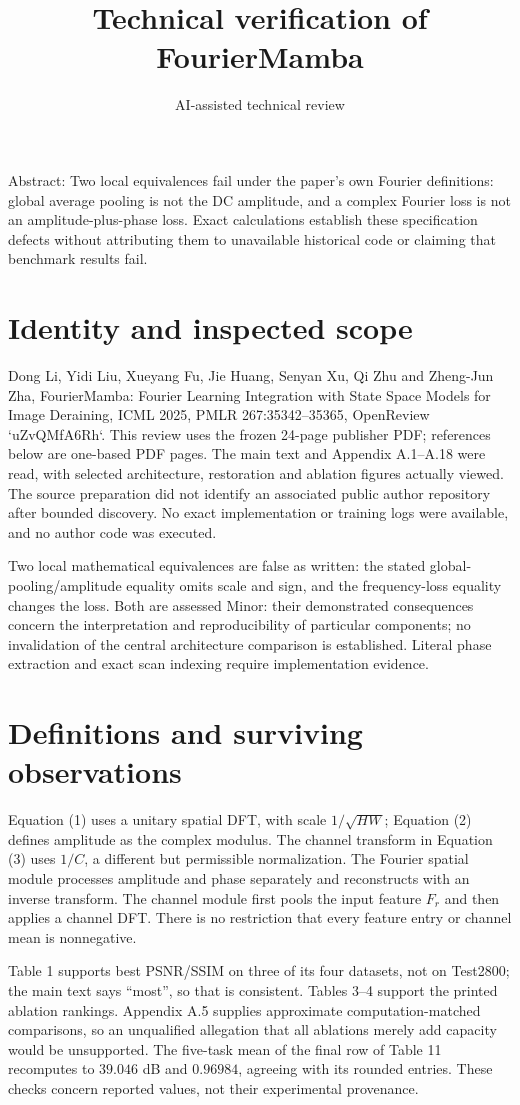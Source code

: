 \documentclass[10pt]{article}
\title{Technical verification of FourierMamba}
\author{AI-assisted technical review}
\date{}
\begin{document}
\maketitle
Abstract: Two local equivalences fail under the paper’s own Fourier definitions: global average pooling is not the DC amplitude, and a complex Fourier loss is not an amplitude-plus-phase loss. Exact calculations establish these specification defects without attributing them to unavailable historical code or claiming that benchmark results fail.\par
\section*{Identity and inspected scope}
Dong Li, Yidi Liu, Xueyang Fu, Jie Huang, Senyan Xu, Qi Zhu and Zheng-Jun Zha, FourierMamba: Fourier Learning Integration with State Space Models for Image Deraining, ICML 2025, PMLR 267:35342–35365, OpenReview `uZvQMfA6Rh`. This review uses the frozen 24-page publisher PDF; references below are one-based PDF pages. The main text and Appendix A.1–A.18 were read, with selected architecture, restoration and ablation figures actually viewed. The source preparation did not identify an associated public author repository after bounded discovery. No exact implementation or training logs were available, and no author code was executed.\par
Two local mathematical equivalences are false as written: the stated global-pooling/amplitude equality omits scale and sign, and the frequency-loss equality changes the loss. Both are assessed Minor: their demonstrated consequences concern the interpretation and reproducibility of particular components; no invalidation of the central architecture comparison is established. Literal phase extraction and exact scan indexing require implementation evidence.\par
\section*{Definitions and surviving observations}
Equation (1) uses a unitary spatial DFT, with scale \(1/\sqrt{HW}\); Equation (2) defines amplitude as the complex modulus. The channel transform in Equation (3) uses \(1/C\), a different but permissible normalization. The Fourier spatial module processes amplitude and phase separately and reconstructs with an inverse transform. The channel module first pools the input feature \(F_r\) and then applies a channel DFT. There is no restriction that every feature entry or channel mean is nonnegative.\par
Table 1 supports best PSNR/SSIM on three of its four datasets, not on Test2800; the main text says “most”, so that is consistent. Tables 3–4 support the printed ablation rankings. Appendix A.5 supplies approximate computation-matched comparisons, so an unqualified allegation that all ablations merely add capacity would be unsupported. The five-task mean of the final row of Table 11 recomputes to \(39.046\) dB and \(0.96984\), agreeing with its rounded entries. These checks concern reported values, not their experimental provenance.\par
\end{document}
